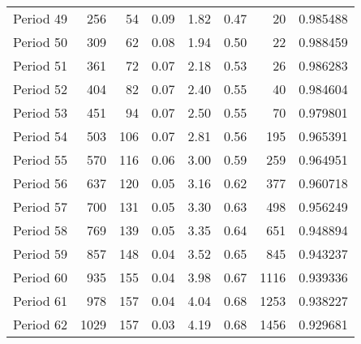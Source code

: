 \begin{tabular}{lrrrrrrl}
Period 49 &                     256 &          54 &        0.09 &        1.82 &        0.47 &          20 &   0.985488 \\
Period 50 &                     309 &          62 &        0.08 &        1.94 &        0.50 &          22 &   0.988459 \\
Period 51 &                     361 &          72 &        0.07 &        2.18 &        0.53 &          26 &   0.986283 \\
Period 52 &                     404 &          82 &        0.07 &        2.40 &        0.55 &          40 &   0.984604 \\
Period 53 &                     451 &          94 &        0.07 &        2.50 &        0.55 &          70 &   0.979801 \\
Period 54 &                     503 &         106 &        0.07 &        2.81 &        0.56 &         195 &   0.965391 \\
Period 55 &                     570 &         116 &        0.06 &        3.00 &        0.59 &         259 &   0.964951 \\
Period 56 &                     637 &         120 &        0.05 &        3.16 &        0.62 &         377 &   0.960718 \\
Period 57 &                     700 &         131 &        0.05 &        3.30 &        0.63 &         498 &   0.956249 \\
Period 58 &                     769 &         139 &        0.05 &        3.35 &        0.64 &         651 &   0.948894 \\
Period 59 &                     857 &         148 &        0.04 &        3.52 &        0.65 &         845 &   0.943237 \\
Period 60 &                     935 &         155 &        0.04 &        3.98 &        0.67 &        1116 &   0.939336 \\
Period 61 &                     978 &         157 &        0.04 &        4.04 &        0.68 &        1253 &   0.938227 \\
Period 62 &                    1029 &         157 &        0.03 &        4.19 &        0.68 &        1456 &   0.929681 \\
\bottomrule
\end{tabular}
